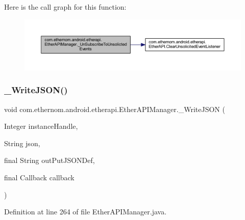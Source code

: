 Here is the call graph for this function\+:\nopagebreak
\begin{figure}[H]
\begin{center}
\leavevmode
\includegraphics[width=350pt]{classcom_1_1ethernom_1_1android_1_1etherapi_1_1_ether_a_p_i_manager_a713f2b3b4f67a096d81f190e1d27f1e7_cgraph}
\end{center}
\end{figure}
\mbox{\label{classcom_1_1ethernom_1_1android_1_1etherapi_1_1_ether_a_p_i_manager_ac427fa54412d242b18a243a1e630ed0f}} 
\subsubsection{\texorpdfstring{\+\_\+\+Write\+J\+S\+O\+N()}{\_WriteJSON()}}
{\footnotesize\ttfamily void com.\+ethernom.\+android.\+etherapi.\+Ether\+A\+P\+I\+Manager.\+\_\+\+Write\+J\+S\+ON (\begin{DoxyParamCaption}\item[{Integer}]{instance\+Handle,  }\item[{String}]{json,  }\item[{final String}]{out\+Put\+J\+S\+O\+N\+Def,  }\item[{final Callback}]{callback }\end{DoxyParamCaption})}



Definition at line 264 of file Ether\+A\+P\+I\+Manager.\+java.

